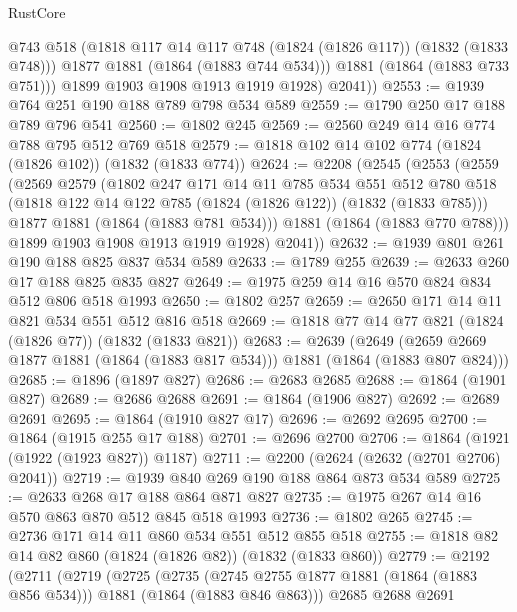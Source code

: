 \begin{lexlean}{RustCore}
\begin{coremodule}
              @743
              @518
              (@1818 @117 @14 @117 @748 (@1824 (@1826 @117)) (@1832 (@1833 @748)))
              @1877
              @1881
              (@1864 (@1883 @744 @534)))
            @1881
            (@1864 (@1883 @733 @751)))
          @1899
          @1903
          @1908
          @1913
          @1919
          @1928)
        @2041))
@2553 := @1939 @764 @251 @190 @188 @789 @798 @534 @589
@2559 := @1790 @250 @17 @188 @789 @796 @541
@2560 := @1802 @245
@2569 := @2560 @249 @14 @16 @774 @788 @795 @512 @769 @518
@2579 := @1818 @102 @14 @102 @774 (@1824 (@1826 @102)) (@1832 (@1833 @774))
@2624 := @2208
    (@2545
      (@2553
        (@2559
          (@2569
            @2579
            (@1802
              @247
              @171
              @14
              @11
              @785
              @534
              @551
              @512
              @780
              @518
              (@1818 @122 @14 @122 @785 (@1824 (@1826 @122)) (@1832 (@1833 @785)))
              @1877
              @1881
              (@1864 (@1883 @781 @534)))
            @1881
            (@1864 (@1883 @770 @788)))
          @1899
          @1903
          @1908
          @1913
          @1919
          @1928)
        @2041))
@2632 := @1939 @801 @261 @190 @188 @825 @837 @534 @589
@2633 := @1789 @255
@2639 := @2633 @260 @17 @188 @825 @835 @827
@2649 := @1975 @259 @14 @16 @570 @824 @834 @512 @806 @518 @1993
@2650 := @1802 @257
@2659 := @2650 @171 @14 @11 @821 @534 @551 @512 @816 @518
@2669 := @1818 @77 @14 @77 @821 (@1824 (@1826 @77)) (@1832 (@1833 @821))
@2683 := @2639
    (@2649 (@2659 @2669 @1877 @1881 (@1864 (@1883 @817 @534))) @1881 (@1864 (@1883 @807 @824)))
@2685 := @1896 (@1897 @827)
@2686 := @2683 @2685
@2688 := @1864 (@1901 @827)
@2689 := @2686 @2688
@2691 := @1864 (@1906 @827)
@2692 := @2689 @2691
@2695 := @1864 (@1910 @827 @17)
@2696 := @2692 @2695
@2700 := @1864 (@1915 @255 @17 @188)
@2701 := @2696 @2700
@2706 := @1864 (@1921 (@1922 (@1923 @827)) @1187)
@2711 := @2200 (@2624 (@2632 (@2701 @2706) @2041))
@2719 := @1939 @840 @269 @190 @188 @864 @873 @534 @589
@2725 := @2633 @268 @17 @188 @864 @871 @827
@2735 := @1975 @267 @14 @16 @570 @863 @870 @512 @845 @518 @1993
@2736 := @1802 @265
@2745 := @2736 @171 @14 @11 @860 @534 @551 @512 @855 @518
@2755 := @1818 @82 @14 @82 @860 (@1824 (@1826 @82)) (@1832 (@1833 @860))
@2779 := @2192
    (@2711
      (@2719
        (@2725
          (@2735
            (@2745 @2755 @1877 @1881 (@1864 (@1883 @856 @534)))
            @1881
            (@1864 (@1883 @846 @863)))
          @2685
          @2688
          @2691

\end{coremodule}
\end{lexlean}
